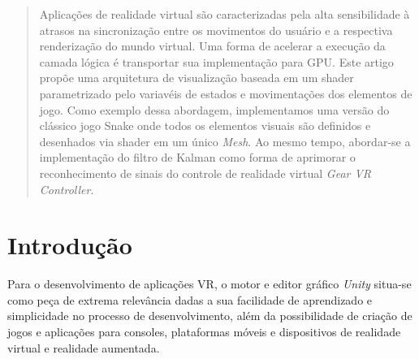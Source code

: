 \documentclass[conference]{IEEEtran}
\begin{document}




\maketitle

\begin{abstract}
Aplicações de realidade virtual são caracterizadas pela alta sensibilidade à atrasos na sincronização entre os movimentos do usuário e a respectiva renderização do mundo virtual. Uma forma de acelerar a execução da camada lógica é transportar sua implementação para GPU.  Este artigo propõe uma arquitetura de visualização baseada em um shader parametrizado pelo variavéis de estados e movimentações dos elementos de jogo. Como exemplo dessa abordagem, implementamos uma versão do clássico jogo Snake onde todos os elementos visuais são definidos e desenhados via shader em um único \textit{Mesh}. Ao mesmo tempo, abordar-se a implementação do filtro de Kalman como forma de aprimorar o reconhecimento de sinais do controle de realidade virtual \textit{Gear VR Controller}.
\end{abstract}





%
\IEEEpeerreviewmaketitle



\section{Introdução} \label{sec:introduction}
Para o desenvolvimento de aplicações VR, o motor e editor gráfico \textit{Unity} situa-se como peça de extrema relevância dadas a sua facilidade de aprendizado e simplicidade no processo de desenvolvimento, além da possibilidade de criação de jogos e aplicações para consoles, plataformas móveis e dispositivos de realidade virtual e realidade aumentada.
\end{document}
